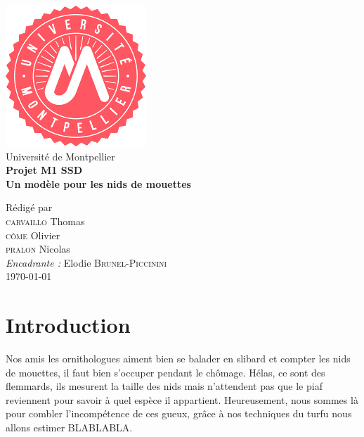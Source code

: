 \documentclass[frenchb]{report}
\newcommand{\1}{\mathbbm{1}}
\theoremstyle{definition}\newtheorem{defn}{Définition}
\theoremstyle{definition}\newtheorem{exm}{Exemple}
\theoremstyle{definition}\newtheorem{nota}{Notation}
\theoremstyle{definition}\newtheorem{rem}{Remarque}
\begin{document}
\begin{titlepage}
\begin{center}
\includegraphics[scale=0.5]{logo.png}\\[1cm]
{\LARGE Université de Montpellier}\\[1.5cm]
\linespread{1.2}\huge {\bfseries Projet M1 SSD }\\[0.5cm]
\linespread{1.2}\LARGE {\bfseries Un modèle pour les nids de mouettes}\\[1.5cm]
\linespread{1}

{\large Rédigé par\\}
{\Large \textsc{carvaillo} Thomas}\\
{\Large \textsc{côme} Olivier}\\
{\Large \textsc{pralon} Nicolas}\\[1cm]
{\large \emph{Encadrante :} Elodie \textsc{Brunel-Piccinini}}\\[1cm] %
\today
\end{center}
\end{titlepage}
\tableofcontents
\newpage

\chapter*{Introduction}
Nos amis les ornithologues aiment bien se balader en slibard et compter les nids de mouettes, il faut bien s'occuper pendant le chômage. Hélas, ce sont des flemmards, ils mesurent la taille des nids mais n'attendent pas que le piaf reviennent pour savoir à quel espèce il appartient. Heureusement, nous sommes là pour combler l'incompétence de ces gueux, grâce à nos techniques du turfu nous allons estimer BLABLABLA. 
\end{document}
